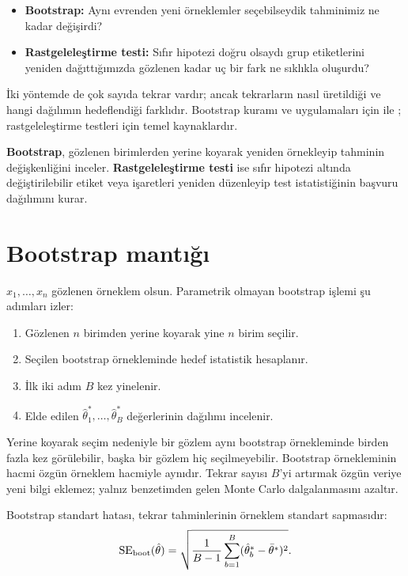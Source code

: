 \begin{itemize}
  \item \textbf{Bootstrap:} Aynı evrenden yeni örneklemler seçebilseydik
  tahminimiz ne kadar değişirdi?
  \item \textbf{Rastgeleleştirme testi:} Sıfır hipotezi doğru olsaydı grup
  etiketlerini yeniden dağıttığımızda gözlenen kadar uç bir fark ne sıklıkla
  oluşurdu?
\end{itemize}

İki yöntemde de çok sayıda tekrar vardır; ancak tekrarların nasıl üretildiği
ve hangi dağılımın hedeflendiği farklıdır. Bootstrap kuramı ve uygulamaları
için \citet{efron1993} ile \citet{davison1997}; rastgeleleştirme testleri için
\citet{good2005} temel kaynaklardır.

\begin{definitionbox}
\textbf{Bootstrap}, gözlenen birimlerden yerine koyarak yeniden örnekleyip
tahminin değişkenliğini inceler. \textbf{Rastgeleleştirme testi} ise sıfır
hipotezi altında değiştirilebilir etiket veya işaretleri yeniden düzenleyip
test istatistiğinin başvuru dağılımını kurar.
\end{definitionbox}

\section{Bootstrap mantığı}
\label{sec:bootstrap}

$x_1,\ldots,x_n$ gözlenen örneklem olsun. Parametrik olmayan bootstrap
işlemi şu adımları izler:

\begin{enumerate}
  \item Gözlenen $n$ birimden yerine koyarak yine $n$ birim seçilir.
  \item Seçilen bootstrap örnekleminde hedef istatistik hesaplanır.
  \item İlk iki adım $B$ kez yinelenir.
  \item Elde edilen $\hat\theta_1^*,\ldots,\hat\theta_B^*$ değerlerinin
  dağılımı incelenir.
\end{enumerate}


Yerine koyarak seçim nedeniyle bir gözlem aynı bootstrap örnekleminde birden
fazla kez görülebilir, başka bir gözlem hiç seçilmeyebilir. Bootstrap
örnekleminin hacmi özgün örneklem hacmiyle aynıdır. Tekrar sayısı $B$'yi
artırmak özgün veriye yeni bilgi eklemez; yalnız benzetimden gelen Monte Carlo
dalgalanmasını azaltır.

Bootstrap standart hatası, tekrar tahminlerinin örneklem standart sapmasıdır:
\[
\operatorname{SE}_{\mathrm{boot}}(\hat\theta)
=\sqrt{\frac{1}{B-1}
\sum_{b=1}^{B}(\hat\theta_b^*-\bar{\theta}^*)^2}.
\]


